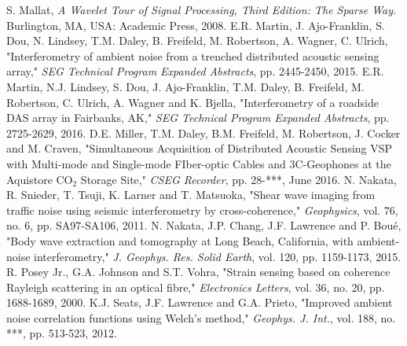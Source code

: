 \documentclass[11pt]{article}
\begin{document}
\begin{thebibliography}{30}
 S. Mallat, \textit{A Wavelet Tour of Signal Processing, Third Edition: The Sparse Way}. Burlington, MA, USA: Academic Press, 2008.
\vspace{-0.2cm}
 E.R. Martin, J. Ajo-Franklin, S. Dou, N. Lindsey, T.M. Daley, B. Freifeld, M. Robertson, A. Wagner, C. Ulrich, "Interferometry of ambient noise from a trenched distributed acoustic sensing array," \textit{SEG Technical Program Expanded Abstracts}, pp. 2445-2450, 2015.
\vspace{-0.2cm}
 E.R. Martin, N.J. Lindsey, S. Dou, J. Ajo-Franklin, T.M. Daley, B. Freifeld, M. Robertson, C. Ulrich, A. Wagner and K. Bjella, "Interferometry of a roadside DAS array in Fairbanks, AK," \textit{SEG Technical Program Expanded Abstracts}, pp. 2725-2629, 2016.
\vspace{-0.2cm}
 D.E. Miller, T.M. Daley, B.M. Freifeld, M. Robertson, J. Cocker and M. Craven, "Simultaneous Acquisition of Distributed Acoustic Sensing VSP with Multi-mode and Single-mode FIber-optic Cables and 3C-Geophones at the Aquistore CO$_2$ Storage Site," \textit{CSEG Recorder}, pp. 28-***, June 2016.
\vspace{-0.2cm}
 N. Nakata, R. Snieder, T. Tsuji, K. Larner and T. Matsuoka, "Shear wave imaging from traffic noise using seismic interferometry by cross-coherence," \textit{Geophysics}, vol. 76, no. 6, pp. SA97-SA106, 2011.
\vspace{-0.2cm}
 N. Nakata, J.P. Chang, J.F. Lawrence and P. Bou\'{e}, "Body wave extraction and tomography at Long Beach, California, with ambient-noise interferometry," \textit{J. Geophys. Res. Solid Earth}, vol. 120, pp. 1159-1173, 2015.
\vspace{-0.2cm}
 R. Posey Jr., G.A. Johnson and S.T. Vohra, "Strain sensing based on coherence Rayleigh scattering in an optical fibre," \textit{Electronics Letters}, vol. 36, no. 20, pp. 1688-1689, 2000.
\vspace{-0.2cm}
 K.J. Seats, J.F. Lawrence and G.A. Prieto, "Improved ambient noise correlation functions using Welch's method," \textit{Geophys. J. Int.}, vol. 188, no. ***, pp. 513-523, 2012.

\end{thebibliography}
\end{document}
